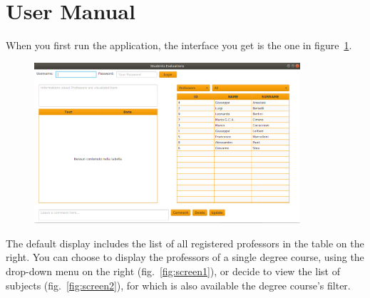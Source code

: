 \documentclass[a4paper, oneside]{article}
\begin{document}
\clearpage
\section{User Manual}
When you first run the application, the interface you get is the one in figure~\ref{fig:screen0}. 

\begin{figure}[h]
\centering
\includegraphics[width=0.88\textwidth]{images/screens/screen0}
\label{fig:screen0}
\end{figure}

The default display includes the list of all registered professors in the table on the right. You can choose to display the professors of a single degree course, using the drop-down menu on the right (fig.~\ref{fig:screen1}), or decide to view the list of subjects (fig.~\ref{fig:screen2}), for which is also available the degree course's filter. 
\end{document}
